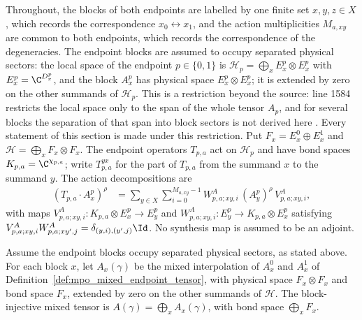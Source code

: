 Throughout, the blocks of both endpoints are labelled by one finite set
$x,y,z\in X$, which records the correspondence $x_0\leftrightarrow x_1$,
and the action multiplicities $M_{a,xy}$ are common to both endpoints,
which records the correspondence of the degeneracies. The endpoint blocks
are assumed to occupy separated physical sectors: the local space of the
endpoint $p\in\{0,1\}$ is $\mathcal H_p=\bigoplus_xE^p_x\otimes E^p_x$
with $E^p_x=\C^{D^p_x}$, and the block $A^p_x$ has physical space
$E^p_x\otimes E^p_x$; it is extended by zero on the other summands of
$\mathcal H_p$. This is a restriction beyond the source: line 1584
restricts the local space only to the span of the whole tensor $A_p$, and
for several blocks the separation of that span into block sectors is not
derived here \cite{gap:glm23_block_injective_mixed_path}. Every statement
of this section is made under this restriction. Put $F_x=E^0_x\oplus E^1_x$ and
$\mathcal H=\bigoplus_xF_x\otimes F_x$. The endpoint operators
$T_{p,a}$ act on $\mathcal H_p$ and have bond spaces
$K_{p,a}=\C^{\chi_{p,a}}$; write $T^{yx}_{p,a}$ for the part of $T_{p,a}$
from the summand $x$ to the summand $y$. The action decompositions are
\begin{align}
    (T_{p,a}\cdot A^p_x)^\rho
     & =\sum_{y\in X}\sum_{i=0}^{M_{a,xy}-1}
    W^A_{p,a;xy,i}\,(A^p_y)^\rho\,V^A_{p,a;xy,i},
    \label{eq:mpo_block_action_input}
\end{align}
with maps $V^A_{p,a;xy,i}:K_{p,a}\otimes E^p_x\to E^p_y$ and
$W^A_{p,a;xy,i}:E^p_y\to K_{p,a}\otimes E^p_x$ satisfying
$V^A_{p,a;xy,i}W^A_{p,a;xy',j}=\delta_{(y,i),(y',j)}\Id$. No synthesis
map is assumed to be an adjoint.

\begin{definition}
    \label{def:mpo_block_mixed_path}
    \leanok
    Assume the endpoint blocks occupy separated physical sectors, as
    stated above. For each block $x$, let $A_x(\gamma)$ be the mixed
    interpolation of
    $A^0_x$ and $A^1_x$ of
    Definition~\ref{def:mpo_mixed_endpoint_tensor}, with physical space
    $F_x\otimes F_x$ and bond space $F_x$, extended by zero on the other
    summands of $\mathcal H$. The block-injective mixed tensor is
    $A(\gamma)=\bigoplus_xA_x(\gamma)$, with bond space $\bigoplus_xF_x$.
\end{definition}

